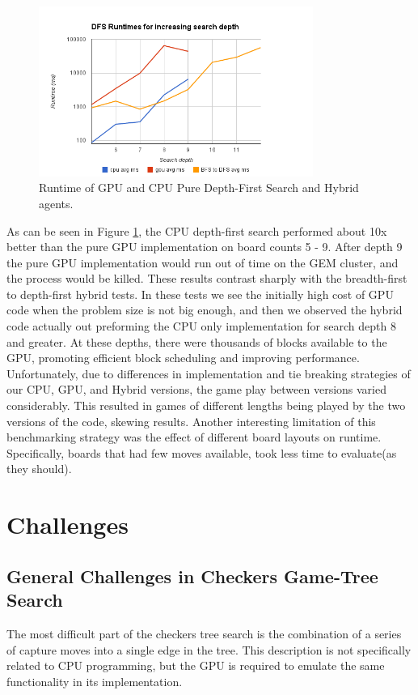 \documentclass[11pt]{article}
\begin{document}
\begin{figure}[!ht]
    \begin{center}
        \includegraphics[width=0.8\textwidth]{pictures/gpu_cpu_dfs_runtimes.png}
        \caption{Runtime of GPU and CPU Pure Depth-First Search and Hybrid agents.}
        \label{fig:gpucpudfsruntimes}
    \end{center}
\end{figure}

As can be seen in Figure \ref{fig:gpucpudfsruntimes}, the CPU depth-first search performed about 10x better than the pure GPU implementation on board counts 5 - 9.
After depth 9 the pure GPU implementation would run out of time on the GEM cluster, and the process would be killed. These results contrast sharply with the
breadth-first to depth-first hybrid tests. In these tests we see the initially high cost of GPU code when the problem size is not big enough, and then we observed the hybrid code
actually out preforming the CPU only implementation for search depth 8 and greater. At these depths, there were thousands of blocks available to the GPU,
promoting efficient block scheduling and improving performance.
    Unfortunately, due to differences in implementation and tie breaking
strategies of our CPU, GPU, and Hybrid versions, the game play between versions varied considerably. This resulted
in games of different lengths being played by the two versions of the code, skewing results. Another interesting
limitation of this benchmarking strategy was the effect of different board layouts on runtime. Specifically, boards
that had few moves available, took less time to evaluate(as they should).

\newpage
\section{Challenges}

\subsection{General Challenges in Checkers Game-Tree Search}
\label{sec:generalchallenges}
The most difficult part of the checkers tree search is the combination of a
series of capture moves into a single edge in the tree. This description is not
specifically related to CPU programming, but the GPU is required to emulate the
same functionality in its implementation.
\end{document}
